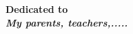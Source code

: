 \chapter*{ }
\label{dedication}
\thispagestyle{empty}
\begin{center}
\Huge\bf  Dedicated to\\
\Huge \em My parents, teachers,.....\\[20ex]
\end{center}
